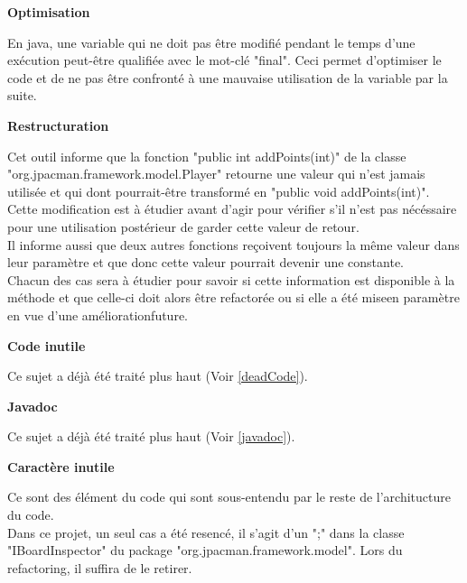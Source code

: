 \documentclass[12pt,a4paper,final]{article}
\newcommand{\smalltitle}[1]{\bigskip\large\textbf{#1}\par\normalsize\medskip}
\begin{document}
\smalltitle{Optimisation}
En java, une variable qui ne doit pas être modifié pendant le temps d'une exécution peut-être qualifiée avec le mot-clé "final". Ceci permet d'optimiser le code et de ne pas être confronté à une mauvaise utilisation de la variable par la suite.

\smalltitle{Restructuration}
Cet outil informe que la fonction "public int addPoints(int)" de la classe "org.jpacman.framework.model.Player" retourne une valeur qui n'est jamais utilisée et qui dont pourrait-être transformé en "public void addPoints(int)".\\
Cette modification est à étudier avant d'agir pour vérifier s'il n'est pas nécéssaire pour une utilisation postérieur de garder cette valeur de retour.\\
Il informe aussi que deux autres fonctions reçoivent toujours la même valeur dans leur paramètre et que donc cette valeur pourrait devenir une constante.\\
Chacun des cas sera à étudier pour savoir si cette information est disponible à la méthode et que celle-ci doit alors être refactorée ou si elle a été miseen paramètre en vue d'une améliorationfuture.

\smalltitle{Code inutile}
Ce sujet a déjà été traité plus haut (Voir \ref{deadCode}).

\smalltitle{Javadoc}
Ce sujet a déjà été traité plus haut (Voir \ref{javadoc}).

\smalltitle{Caractère inutile}
Ce sont des élément du code qui sont sous-entendu par le reste de l'architucture du code.\\
Dans ce projet, un seul cas a été resencé, il s'agit d'un ";" dans la classe "IBoardInspector" du package "org.jpacman.framework.model". Lors du refactoring, il suffira de le retirer.
\end{document}

